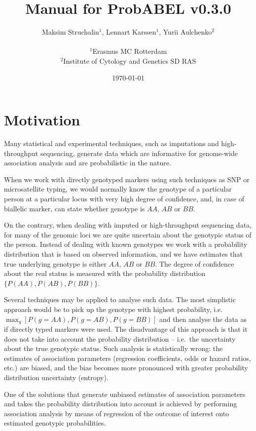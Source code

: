 \documentclass[12pt,a4paper]{article}
\title{Manual for ProbABEL v0.3.0}
\author{
Maksim Struchalin$^{1}$, Lennart Karssen$^{1}$, Yurii Aulchenko$^{2}$ \\
\\
$^{1}$Erasmus MC Rotterdam \\
$^{2}$Institute of Cytology and Genetics SD RAS
}
\date{\today}
\begin{document}
\maketitle
\tableofcontents


\section{Motivation}

Many statistical and experimental techniques, such as imputations and
high-throughput sequencing, generate data which are informative for
genome-wide association analysis and are probabilistic in the nature.

When we work with directly genotyped markers using such techniques as
SNP or microsatellite typing, we would normally know the genotype of
a particular person at a particular locus with very high degree of
confidence, and, in case of biallelic marker, can state whether
genotype is $AA$, $AB$ or $BB$.

On the contrary, when dealing with imputed or high-throughput
sequencing data, for many of the genomic loci we are quite uncertain
about the genotypic status of the person. Instead of dealing with
known genotypes we work with a probability distribution that is based
on observed information, and we have estimates that true underlying
genotype is either $AA$, $AB$ or $BB$. The degree of confidence about
the real status is measured with the probability distribution
$\{P(AA), P(AB), P(BB)\}$.

Several techniques may be applied to analyse such data. The most
simplistic approach would be to pick up the genotype with highest
probability, i.e.~$\max_g[P(g=AA), P(g=AB), P(g=BB)]$ and then
analyse the data as if directly typed markers were used. The
disadvantage of this approach is that it does not take into
account the probability distribution -- i.e.~the uncertainty
about the true genotypic status. Such
analysis is statistically wrong: the estimates of association
parameters (regression coefficients, odds or hazard ratios, etc.)
are biased, and the bias becomes more pronounced with greater
probability distribution uncertainty (entropy).

One of the solutions that generate unbiased estimates
of association parameters and takes the
probability distribution into account is achieved by
performing association analysis by means of regression of the
outcome of interest onto estimated genotypic probabilities.
\end{document}
